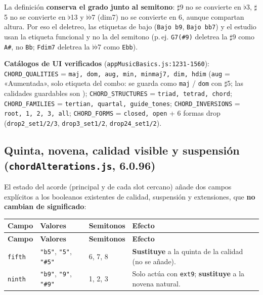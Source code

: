 \documentclass[a4paper,11pt,oneside]{report}
\newcommand{\flt}{\ensuremath{\flat}}
\newcommand{\shp}{\ensuremath{\sharp}}
\begin{document}
La definición \textbf{conserva el grado junto al semitono}: \shp9 no se convierte en \flt3, \shp5 no se convierte en \flt13 y \flt\flt7 (dim7) no se convierte en 6, aunque compartan altura. Por eso el deletreo, las etiquetas de bajo (\lstinline!Bajo b9!, \lstinline!Bajo bb7!) y el estudio usan la etiqueta funcional y no la del semitono (p.\,ej. \lstinline!G7(#9)! deletrea la \shp9 como \lstinline!A#!, no \lstinline!Bb!; \lstinline!Fdim7! deletrea la \flt\flt7 como \lstinline!Ebb!).

\textbf{Catálogos de UI verificados} (\lstinline!appMusicBasics.js:1231-1560!): \lstinline!CHORD_QUALITIES! = \lstinline!maj, dom, aug, min, minmaj7, dim, hdim! (\lstinline!aug! = «Aumentada», solo etiqueta del combo: se guarda como \lstinline!maj! / \lstinline!dom! con \shp5; las calidades guardables son \texttt{}); \lstinline!CHORD_STRUCTURES! = \lstinline!triad, tetrad, chord!; \lstinline!CHORD_FAMILIES! = \lstinline!tertian, quartal, guide_tones!; \lstinline!CHORD_INVERSIONS! = \lstinline!root, 1, 2, 3, all!; \lstinline!CHORD_FORMS! = \lstinline!closed, open! + 6 formas drop (\lstinline!drop2_set1/2/3!, \lstinline!drop3_set1/2!, \lstinline!drop24_set1/2!).

\subsection{Quinta, novena, calidad visible y suspensión (\texttt{chordAlterations.js}, 6.0.96)}
\label{sec:7.4.1}

El estado del acorde (principal y de cada slot cercano) añade dos campos explícitos a los booleanos existentes de calidad, suspensión y extensiones, que \textbf{no cambian de significado}:

\begin{center}
\begin{longtable}{L{1.8cm}L{3.4cm}C{1.7cm}L{7.0cm}}
\toprule
{}\textbf{Campo} & \textbf{Valores} & \textbf{Semitonos} & \textbf{Efecto}\\
\midrule
\endfirsthead
{}\textbf{Campo} & \textbf{Valores} & \textbf{Semitonos} & \textbf{Efecto}\\
\midrule
\endhead
\bottomrule
\endlastfoot
\lstinline!fifth! & \lstinline!"b5"!, \lstinline!"5"!, \lstinline!"#5"! & 6, 7, 8 & \textbf{Sustituye} a la quinta de la calidad (no se añade).\\
\lstinline!ninth! & \lstinline!"b9"!, \lstinline!"9"!, \lstinline!"#9"! & 1, 2, 3 & Solo actúa con \lstinline!ext9!; \textbf{sustituye} a la novena natural.\\
\end{longtable}
\end{center}
\end{document}
